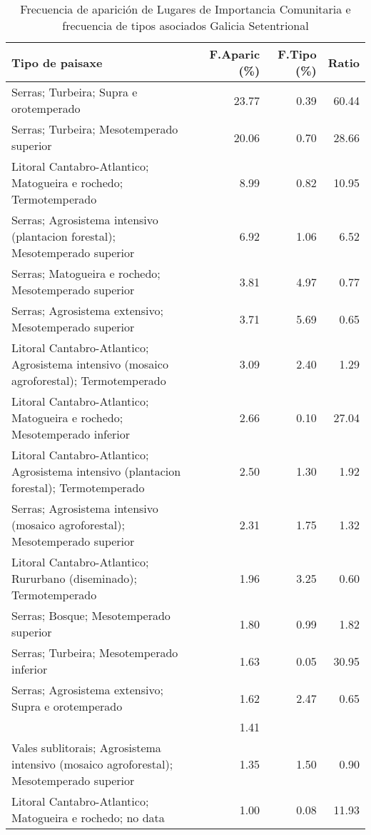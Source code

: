 \begin{table}[p]
\centering
\caption{Frecuencia de aparición de Lugares de Importancia Comunitaria e frecuencia de tipos asociados Galicia Setentrional} 
\label{vnatura10}
\begin{tabular}{lrrr}
  \hline
Tipo de paisaxe & F.Aparic (\%) & F.Tipo (\%) & Ratio \\ 
  \hline
Serras; Turbeira; Supra e orotemperado & 23.77 & 0.39 & 60.44 \\ 
  Serras; Turbeira; Mesotemperado superior & 20.06 & 0.70 & 28.66 \\ 
  Litoral Cantabro-Atlantico; Matogueira e rochedo; Termotemperado & 8.99 & 0.82 & 10.95 \\ 
  Serras; Agrosistema intensivo (plantacion forestal); Mesotemperado superior & 6.92 & 1.06 & 6.52 \\ 
  Serras; Matogueira e rochedo; Mesotemperado superior & 3.81 & 4.97 & 0.77 \\ 
  Serras; Agrosistema extensivo; Mesotemperado superior & 3.71 & 5.69 & 0.65 \\ 
  Litoral Cantabro-Atlantico; Agrosistema intensivo (mosaico agroforestal); Termotemperado & 3.09 & 2.40 & 1.29 \\ 
  Litoral Cantabro-Atlantico; Matogueira e rochedo; Mesotemperado inferior & 2.66 & 0.10 & 27.04 \\ 
  Litoral Cantabro-Atlantico; Agrosistema intensivo (plantacion forestal); Termotemperado & 2.50 & 1.30 & 1.92 \\ 
  Serras; Agrosistema intensivo (mosaico agroforestal); Mesotemperado superior & 2.31 & 1.75 & 1.32 \\ 
  Litoral Cantabro-Atlantico; Rururbano (diseminado); Termotemperado & 1.96 & 3.25 & 0.60 \\ 
  Serras; Bosque; Mesotemperado superior & 1.80 & 0.99 & 1.82 \\ 
  Serras; Turbeira; Mesotemperado inferior & 1.63 & 0.05 & 30.95 \\ 
  Serras; Agrosistema extensivo; Supra e orotemperado & 1.62 & 2.47 & 0.65 \\ 
   & 1.41 &  &  \\ 
  Vales sublitorais; Agrosistema intensivo (mosaico agroforestal); Mesotemperado superior & 1.35 & 1.50 & 0.90 \\ 
  Litoral Cantabro-Atlantico; Matogueira e rochedo; no data & 1.00 & 0.08 & 11.93 \\ 
   \hline
\end{tabular}
\end{table}
